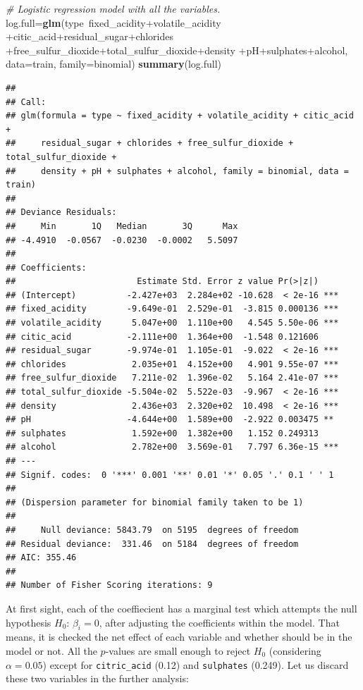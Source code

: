 \documentclass[12pt,]{article}
\newenvironment{Shaded}{\begin{snugshade}}{\end{snugshade}}
\newcommand{\KeywordTok}[1]{\textcolor[rgb]{0.13,0.29,0.53}{\textbf{{#1}}}}
\newcommand{\DataTypeTok}[1]{\textcolor[rgb]{0.13,0.29,0.53}{{#1}}}
\newcommand{\CommentTok}[1]{\textcolor[rgb]{0.56,0.35,0.01}{\textit{{#1}}}}
\newcommand{\NormalTok}[1]{{#1}}
\begin{document}
\begin{Shaded}
\begin{Highlighting}[]
\CommentTok{# Logistic regression model with all the variables.}
\NormalTok{log.full=}\KeywordTok{glm}\NormalTok{(type~fixed_acidity+volatile_acidity}
             \NormalTok{+citic_acid+residual_sugar+chlorides}
             \NormalTok{+free_sulfur_dioxide+total_sulfur_dioxide+density}
             \NormalTok{+pH+sulphates+alcohol, }\DataTypeTok{data=}\NormalTok{train, }\DataTypeTok{family=}\NormalTok{binomial)}
\KeywordTok{summary}\NormalTok{(log.full)}
\end{Highlighting}
\end{Shaded}

\begin{verbatim}
## 
## Call:
## glm(formula = type ~ fixed_acidity + volatile_acidity + citic_acid + 
##     residual_sugar + chlorides + free_sulfur_dioxide + total_sulfur_dioxide + 
##     density + pH + sulphates + alcohol, family = binomial, data = train)
## 
## Deviance Residuals: 
##     Min       1Q   Median       3Q      Max  
## -4.4910  -0.0567  -0.0230  -0.0002   5.5097  
## 
## Coefficients:
##                        Estimate Std. Error z value Pr(>|z|)    
## (Intercept)          -2.427e+03  2.284e+02 -10.628  < 2e-16 ***
## fixed_acidity        -9.649e-01  2.529e-01  -3.815 0.000136 ***
## volatile_acidity      5.047e+00  1.110e+00   4.545 5.50e-06 ***
## citic_acid           -2.111e+00  1.364e+00  -1.548 0.121606    
## residual_sugar       -9.974e-01  1.105e-01  -9.022  < 2e-16 ***
## chlorides             2.035e+01  4.152e+00   4.901 9.55e-07 ***
## free_sulfur_dioxide   7.211e-02  1.396e-02   5.164 2.41e-07 ***
## total_sulfur_dioxide -5.504e-02  5.522e-03  -9.967  < 2e-16 ***
## density               2.436e+03  2.320e+02  10.498  < 2e-16 ***
## pH                   -4.644e+00  1.589e+00  -2.922 0.003475 ** 
## sulphates             1.592e+00  1.382e+00   1.152 0.249313    
## alcohol               2.782e+00  3.569e-01   7.797 6.36e-15 ***
## ---
## Signif. codes:  0 '***' 0.001 '**' 0.01 '*' 0.05 '.' 0.1 ' ' 1
## 
## (Dispersion parameter for binomial family taken to be 1)
## 
##     Null deviance: 5843.79  on 5195  degrees of freedom
## Residual deviance:  331.46  on 5184  degrees of freedom
## AIC: 355.46
## 
## Number of Fisher Scoring iterations: 9
\end{verbatim}

At first sight, each of the coeffiecient has a marginal test which
attempts the null hypothesis \(H_0\): \(\beta_i = 0\), after adjusting
the coefficients within the model. That means, it is checked the net
effect of each variable and whether should be in the model or not. All
the \(p\)-values are small enough to reject \(H_0\) (considering
\(\alpha = 0.05\)) except for \texttt{citric\_acid} (0.12) and
\texttt{sulphates} (0.249). Let us discard these two variables in the
further analysis:
\end{document}
